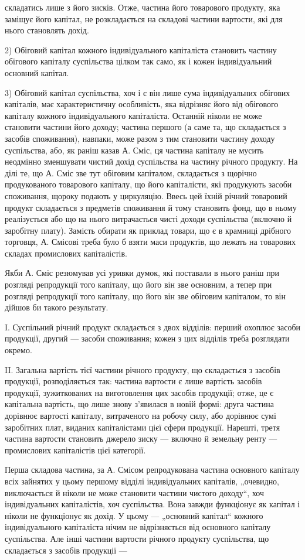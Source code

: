 \parcont{}  %
складатись лише з його зисків. Отже, частина його товарового продукту,
яка заміщує його капітал, не розкладається на складові частини вартости,
які для нього становлять дохід.

2) Обіговий капітал кожного індивідуального капіталіста становить
частину обігового капіталу суспільства цілком так само, як і кожен індивідуальний
основний капітал.

3) Обіговий капітал суспільства, хоч і є він лише сума індивідуальних
обігових капіталів, має характеристичну особливість, яка відрізняє
його від обігового капіталу кожного індивідуального капіталіста. Останній
ніколи не може становити частини його доходу; частина першого
(а саме та, що складається з засобів споживання), навпаки, може разом
з тим становити частину доходу суспільства, або, як раніш казав
А. Сміс, ця частина капіталу не мусить неодмінно зменшувати чистий
дохід суспільства на частину річного продукту. На ділі те, що А. Сміс
зве тут обіговим капіталом, складається з щорічно продукованого товарового
капіталу, що його капіталісти, які продукують засоби споживання,
щороку подають у циркуляцію. Ввесь цей їхній річний товаровий продукт
складається з предметів споживання й тому становить фонд, що в ньому
реалізується або що на нього витрачається чисті доходи суспільства (включно
й заробітну плату). Замість обирати як приклад товари, що є в крамниці
дрібного торговця, А. Смісові треба було б взяти маси продуктів, що
лежать на товарових складах промислових капіталістів.

Якби А. Сміс резюмував усі уривки думок, які поставали в нього
раніш при розгляді репродукції того капіталу, що його він зве основним,
а тепер при розгляді репродукції того капіталу, що його він зве
обіговим капіталом, то він дійшов би такого результату.

I. Суспільний річний продукт складається з двох відділів: перший
охоплює засоби продукції, другий — засоби споживання; кожен з цих
відділів треба розглядати окремо.

II. Загальна вартість тієї частини річного продукту, що складається
з засобів продукції, розподіляється так: частина вартости є
лише вартість засобів продукції, зужиткованих на виготовлення цих засобів
продукції; отже, це є капітальна вартість, що лише знову з’явилася
в новій формі: друга частина дорівнює вартості капіталу, витраченого
на робочу силу, або дорівнює сумі заробітних плат, виданих капіталістами
цієї сфери продукції. Нарешті, третя частина вартости становить
джерело зиску — включно й земельну ренту — промислових капіталістів
цієї категорії.

Перша складова частина, за А. Смісом репродукована частина основного
капіталу всіх зайнятих у цьому першому відділі індивідуальних
капіталів, „очевидно, виключається й ніколи не може становити частини
чистого доходу“, хоч індивідуальних капіталістів, хоч суспільства. Вона
завжди функціонує як капітал і ніколи не функціонує як дохід. У цьому
— „основний капітал“ кожного індивідуального капіталіста нічим не
відрізняється від основного капіталу суспільства. Але інші частини вартости
річного продукту суспільства, що складається з засобів продукції —
\parbreak{}  %
